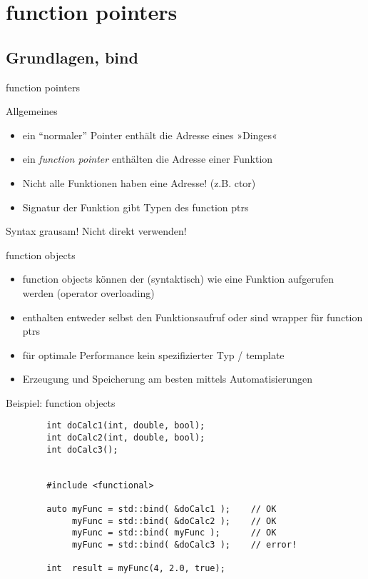 ﻿\section{function pointers}


\subsection{Grundlagen, bind}

\begin{frame}{function pointers}
	\footnotesize
	
	\begin{block}{Allgemeines}
		\begin{itemize}
			\item ein \enquote{normaler} Pointer enthält die Adresse eines »Dinges«
			\item ein \emph{function pointer} enthälten die Adresse einer Funktion
			\item Nicht alle Funktionen haben eine Adresse! (z.B. ctor)
			\item Signatur der Funktion gibt Typen des function ptrs
		\end{itemize}
	\end{block}
	
	\pause
	
	Syntax grausam! Nicht direkt verwenden!
	
	\begin{block}{function objects}
		\begin{itemize}
			\item function objects können der (syntaktisch) wie eine Funktion aufgerufen werden (operator overloading)
			\item enthalten entweder selbst den Funktionsaufruf oder sind wrapper für function ptrs
			\item für optimale Performance kein spezifizierter Typ / template
			\item Erzeugung und Speicherung am besten mittels Automatisierungen
		\end{itemize}
	\end{block}
\end{frame}

\begin{frame}[fragile]{Beispiel: function objects}
	\begin{lstlisting}
		int doCalc1(int, double, bool);
		int doCalc2(int, double, bool);
		int doCalc3();
		
		
		#include <functional>
		
		auto myFunc = std::bind( &doCalc1 );	// OK
		     myFunc = std::bind( &doCalc2 );	// OK
		     myFunc = std::bind( myFunc );		// OK
		     myFunc = std::bind( &doCalc3 );	// error!
		
		int  result = myFunc(4, 2.0, true);
	\end{lstlisting}
\end{frame}

